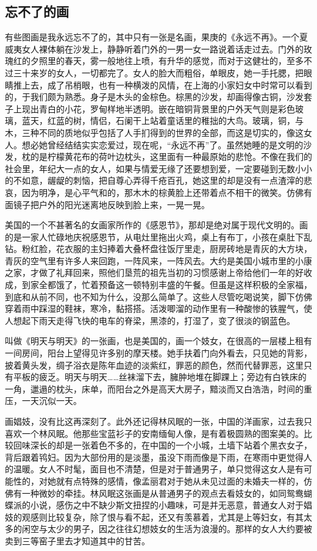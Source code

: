 \subsection{忘不了的画}

\par 有些图画是我永远忘不了的，其中只有一张是名画，果庚的《永远不再》。一个夏威夷女人裸体躺在沙发上，静静听着门外的一男一女一路说着话走过去。门外的玫瑰红的夕照里的春天，雾一般地往上喷，有升华的感觉，而对于这健壮的，至多不过三十来岁的女人，一切都完了。女人的脸大而粗俗，单眼皮，她一手托腮，把眼睛推上去，成了吊梢眼，也有一种横泼的风情，在上海的小家妇女中时常可以看到的，于我们颇为熟悉。身子是木头的金棕色。棕黑的沙发，却画得像古铜，沙发套子上现出青白的小花，罗甸样地半透明。嵌在暗铜背景里的户外天气则是彩色玻璃，蓝天，红蓝的树，情侣，石阑干上站着童话里的稚拙的大鸟。玻璃，铜，与木，三种不同的质地似乎包括了人手扪得到的世界的全部，而这是切实的，像这女人。想必她曾经结结实实恋爱过，现在呢，“永远不再”了。虽然她睡的是文明的沙发，枕的是柠檬黄花布的荷叶边枕头，这里面有一种最原始的悲怆。不像在我们的社会里，年纪大一点的女人，如果与情爱无缘了还要想到爱，一定要碰到无数小小的不如意，龌龊的刺恼，把自尊心弄得千疮百孔，她这里的却是没有一点渣滓的悲哀，因为明净，是心平气和的，那木木的棕黄脸上还带着点不相干的微笑。仿佛有面镜子把户外的阳光迷离地反映到脸上来，一晃一晃。
\par 美国的一个不甚著名的女画家所作的《感恩节》，那却是绝对属于现代文明的。画的是一家人忙碌地庆祝感恩节，从电灶里拖出火鸡，桌上有布丁，小孩在桌肚下乱钻。粉红脸，花衣服的主妇捧着大叠杯盘往饭厅里走，厨房砖地是青灰的大方块，青灰的空气里有许多人来回跑，一阵风来，一阵风去。大约是美国小城市里的小康之家，才做了礼拜回来，照他们垦荒的祖先当初的习惯感谢上帝给他们一年的好收成，到家全都饿了，忙着预备这一顿特别丰盛的午餐。但虽是这样积极的全家福，到底和从前不同，也不知为什么，没那么简单了。这些人尽管吃喝说笑，脚下仿佛穿着雨中踩湿的鞋袜，寒冷，黏搭搭。活泼唧溜的动作里有一种酸惨的铁腥气，使人想起下雨天走得飞快的电车的脊梁，黑漆的，打湿了，变了很淡的钢蓝色。
\par 叫做《明天与明天》的一张画，也是美国的，画一个妓女，在很高的一层楼上租有一间房间，阳台上望得见许多别的摩天楼。她手扶着门向外看去，只见她的背影，披着黄头发，绸子浴衣是陈年血迹的淡紫红，罪恶的颜色，然而代替罪恶，这里只有平板的疲乏。明天与明天……丝袜溜下去，臃肿地堆在脚踝上；旁边有白铁床的一角，邋遢的枕头，床单，而阳台之外是高天大房子，黯淡而又白浩浩，时间的重压，一天沉似一天。
\par 画娼妓，没有比这再深刻了。此外还记得林风眠的一张，中国的洋画家，过去我只喜欢一个林风眠。他那些宝蓝衫子的安南缅甸人像，是有着极圆熟的图案美的。比较回味深长的却是一张着色不多的，在中国的一个小城，土墙下站着个黑衣女子，背后跟着鸨妇。因为大部份用的是淡墨，虽没下雨而像是下雨，在寒雨中更觉得人的温暖。女人不时髦，面目也不清楚，但是对于普通男子，单只觉得这女人是有可能性的，对她就有点特殊的感情，像孟丽君对于她从未见过面的未婚夫一样的，仿佛有一种微妙的牵挂。林风眠这张画是从普通男子的观点去看妓女的，如同鸳鸯蝴蝶派的小说，感伤之中不缺少斯文扭捏的小趣味，可是并无恶意，普通女人对于娼妓的观感则比较复杂，除了恨与看不起，还又有羡慕着，尤其是上等妇女，有其太多的闲空与太少的男子，因之往往幻想妓女的生活为浪漫的。那样的女人大约要被卖到三等窑子里去才知道其中的甘苦。
